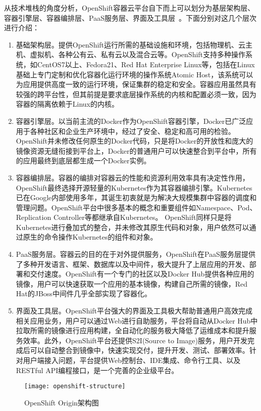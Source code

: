 从技术堆栈的角度分析，OpenShift容器云平台自下而上可以划分为基层架构层、容器引擎层、容器编排层、PaaS服务层、界面及工具层~\cite{2017Kubernetes}。下面分别对这几个层次进行介绍：
\begin{enumerate}[1.]
	\item 基础架构层。提供OpenShift运行所需的基础设施和环境，包括物理机、云主机、虚拟机、各种公有云、私有云以及混合云等。OpenShift支持多种操作系统，如CentOS7以上、Fedora21、Red Hat Enterprise Linux等，包括在Linux基础上专门定制和优化容器化运行环境的操作系统Atomic Host，该系统可以为应用提供高度一致的运行环境，保证集群的稳定和安全。容器应用虽然具有较强的跨平台性，但其前提是要求底层操作系统的内核和配置必须一致，因为容器的隔离依赖于Linux的内核。
	\item 容器引擎层。以当前主流的Docker作为OpenShift容器引擎，Docker已广泛应用于各种社区和企业生产环境中，经过了安全、稳定和高可用的检验。OpenShift并未修改任何原生的Docker代码，只是将Docker的开放性和庞大的镜像资源无缝衔接到平台上，Docker的普通用户可以快速整合到平台中，所有的应用最终到底层都生成一个Docker实例。
	\item 容器编排层。容器的编排对容器云的性能和资源利用效率具有决定性作用，OpenShift最终选择开源轻量的Kubernetes作为其容器编排引擎。Kubernetes已在Google内部使用多年，其诞生初衷就是为解决大规模集群中容器的调度和管理问题。OpenShift平台中很多基本的概念和重要组件如Namespace、Pod、Replication Controller等都继承自Kubernetes。
	OpenShift同样只是将Kubernetes进行叠加式的整合，并未修改其原生代码和对象，用户依然可以通过原生的命令操作Kubernetes的组件和对象。
	\item PaaS服务层。容器云的目的在于对外提供服务，OpenShift在PaaS服务层提供了多种开发语言、框架、数据库以及中间件，极大提升了上层应用的开发、部署和交付速度。OpenShift有一个专门的社区以及Docker Hub提供各种应用的镜像，用户可以快速获取一个应用的基本镜像，构建自己所需的镜像，Red Hat的JBoss中间件几乎全部实现了容器化。
	\item 界面及工具层。OpenShift平台强大的界面及工具极大帮助普通用户高效完成相关应用业务，用户可以通过Web进行自助服务，平台将自动从Docker Hub中拉取所需的镜像进行应用构建，全自动化的服务极大降低了运维成本和提升服务效率。此外，OpenShift平台还提供S2I(Source to Image)服务，用户开发完成后可以自动整合到镜像中，快速实现交付，提升开发、测试、部署效率。针对用户端接入问题，平台提供Web控制台、IDE集成、命令行工具、以及RESTful API编程接口，是一个完善的企业级平台。
\end{enumerate}
\begin{figure}[H] %
	\centering
	\texttt{[image: openshift-structure]}
	\caption{OpenShift Origin架构图}
\end{figure}


